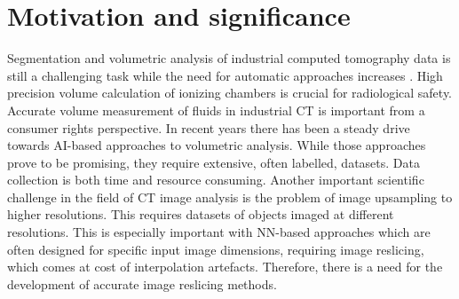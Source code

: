 \documentclass[preprint,12pt, a4paper]{elsarticle}
\begin{document}

\section{Motivation and significance}
Segmentation and volumetric analysis of industrial computed tomography data is still a challenging task while the need for automatic approaches increases \cite{bellens_machine_2024}. High precision volume calculation of ionizing chambers is crucial for radiological safety. Accurate volume measurement of fluids in industrial CT is important from a consumer rights perspective. In recent years there has been a steady drive towards AI-based approaches to volumetric analysis. While those approaches prove to be promising, they require extensive, often labelled, datasets. Data collection is both time and resource consuming. Another important scientific challenge in the field of CT image analysis is the problem of image upsampling to higher resolutions. This requires datasets of objects imaged at different resolutions. This is especially important with NN-based approaches which are often designed for specific input image dimensions, requiring image reslicing, which comes at cost of interpolation artefacts. Therefore, there is a need for the development of accurate image reslicing methods.
\end{document}
